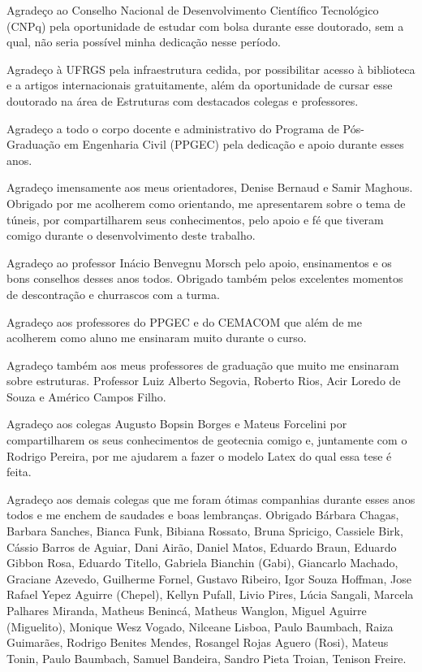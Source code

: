 Agradeço ao Conselho Nacional de Desenvolvimento Científico Tecnológico (CNPq) pela oportunidade de estudar com bolsa durante esse doutorado, sem a qual, não seria possível minha dedicação nesse período.

Agradeço à UFRGS pela infraestrutura cedida, por possibilitar acesso à biblioteca e a artigos internacionais gratuitamente, além da oportunidade de cursar esse doutorado na área de Estruturas com destacados colegas e professores.

Agradeço a todo o corpo docente e administrativo do Programa de Pós-Graduação em Engenharia Civil (PPGEC) pela dedicação e apoio durante esses anos.

Agradeço imensamente aos meus orientadores, Denise Bernaud e Samir Maghous. Obrigado por me acolherem como orientando, me apresentarem sobre o tema de túneis, por compartilharem seus conhecimentos, pelo apoio e fé que tiveram comigo durante o desenvolvimento deste trabalho.

Agradeço ao professor Inácio Benvegnu Morsch pelo apoio, ensinamentos e os bons conselhos desses anos todos. Obrigado também pelos excelentes momentos de descontração e churrascos com a turma.

Agradeço aos professores do PPGEC e do CEMACOM que além de me acolherem como aluno me ensinaram muito durante o curso.

Agradeço também aos meus professores de graduação que muito me ensinaram sobre estruturas. Professor Luiz Alberto Segovia, Roberto Rios, Acir Loredo de Souza e Américo Campos Filho.

Agradeço aos colegas Augusto Bopsin Borges e Mateus Forcelini por compartilharem os seus conhecimentos de geotecnia comigo e, juntamente com o Rodrigo Pereira, por me ajudarem a fazer o modelo Latex do qual essa tese é feita.

Agradeço aos demais colegas que me foram ótimas companhias durante esses anos todos e me enchem de saudades e boas lembranças. Obrigado Bárbara Chagas, Barbara Sanches, Bianca Funk, Bibiana Rossato, Bruna Spricigo, Cassiele Birk, Cássio Barros de Aguiar, Dani Airão, Daniel Matos, Eduardo Braun, Eduardo Gibbon Rosa, Eduardo Titello, Gabriela Bianchin (Gabi), Giancarlo Machado, Graciane Azevedo, Guilherme Fornel, Gustavo Ribeiro, Igor Souza Hoffman, Jose Rafael Yepez Aguirre (Chepel), Kellyn Pufall, Livio Pires, Lúcia Sangali, Marcela Palhares Miranda, Matheus Benincá, Matheus Wanglon, Miguel Aguirre (Miguelito), Monique Wesz Vogado, Nilceane Lisboa, Paulo Baumbach, Raiza Guimarães, Rodrigo Benites Mendes, Rosangel Rojas Aguero (Rosi), Mateus Tonin, Paulo Baumbach, Samuel Bandeira, Sandro Pieta Troian, Tenison Freire.

